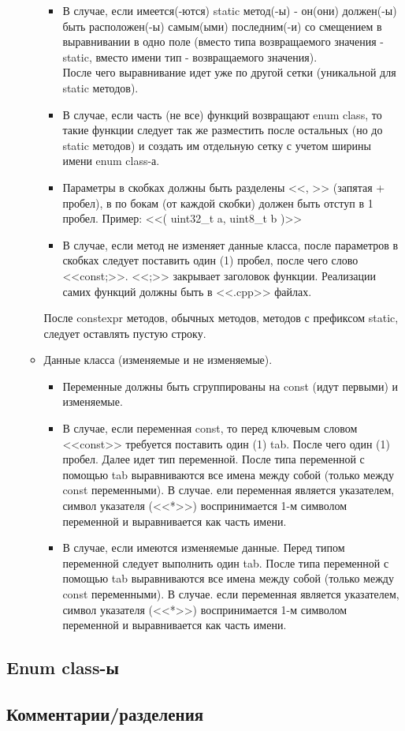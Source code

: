 \begin{enumerate}
\begin{itemize}
\begin{itemize}
		\item В случае, если имеется(-ются) static метод(-ы) - он(они) должен(-ы) быть расположен(-ы) самым(ыми) последним(-и) со смещением в выравнивании в одно поле (вместо типа возвращаемого значения - static, вместо имени тип - возвращаемого значения).\\После чего выравнивание идет уже по другой сетки (уникальной для static методов).
		\item В случае, если часть (не все) функций возвращают enum class, то такие функции следует так же разместить после остальных (но до static методов) и создать им отдельную сетку с учетом ширины имени enum class-а.
		\item Параметры в скобках должны быть разделены <<, >> (запятая + пробел), в по бокам (от каждой скобки) должен быть отступ в 1 пробел. Пример: <<( uint32\_t a, uint8\_t b )>>
		\item В случае, если метод не изменяет данные класса, после параметров в скобках следует поставить один (1) пробел, после чего слово <<const;>>. <<;>> закрывает заголовок функции. Реализации самих функций должны быть в <<.cpp>> файлах.
	\end{itemize}
	После constexpr методов, обычных методов, методов с префиксом static, следует оставлять пустую строку. 
	\item Данные класса (изменяемые и не изменяемые).
	\begin{itemize}
		\item Переменные должны быть сгруппированы на const (идут первыми) и изменяемые.
		\item В случае, если переменная const, то перед ключевым словом <<const>> требуется поставить один (1) tab. После чего один (1) пробел. Далее идет тип переменной. После типа переменной с помощью tab выравниваются все имена между собой (только между const переменными). В случае. ели переменная является указателем, символ указателя (<<*>>) воспринимается 1-м символом переменной и выравнивается как часть имени.
		\item В случае, если имеются изменяемые данные. Перед типом переменной следует выполнить один tab. После типа переменной с помощью tab выравниваются все имена между собой (только между const переменными). В случае. если переменная является указателем, символ указателя (<<*>>) воспринимается 1-м символом переменной и выравнивается как часть имени.
	\end{itemize}
\end{itemize}
\end{enumerate}

\subsection{Enum class-ы}
\subsection{Комментарии/разделения}
